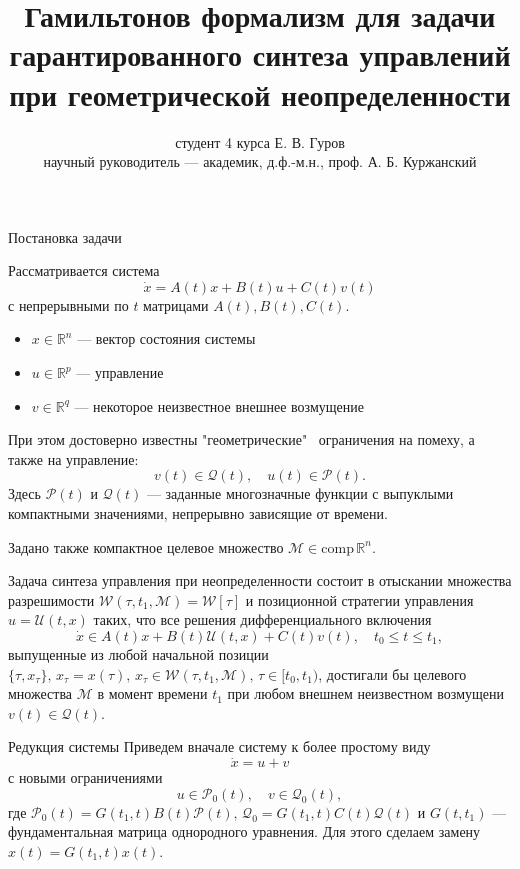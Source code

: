 \documentclass{beamer}
\title[ВКР]
{Гамильтонов формализм для задачи гарантированного синтеза управлений при геометрической неопределенности}
\author[Е. В. Гуров]
{студент 4 курса Е. В. Гуров \\
научный руководитель --- академик, д.ф.-м.н., проф. А. Б. Куржанский}
\institute[СА]
{ Кафедра системного анализа \\
факультета ВМК МГУ имени М.В. Ломоносова}
\date[2 июня 2022 г.]
\begin{document}
\frame{\titlepage}

\begin{frame}{Постановка задачи}

Рассматривается система
\begin{equation*}
    \dot{x} = A(t)x + B(t)u + C(t)v(t)
\end{equation*}
с непрерывными по \( t \) матрицами \( A(t), B(t), C(t) \).
\begin{itemize}
    \item \( x \in \mathbb{R}^n \) --- вектор состояния системы
    \item \( u \in \mathbb{R}^p \) --- управление
    \item \( v \in \mathbb{R}^q \) --- некоторое неизвестное внешнее возмущение
\end{itemize}
При этом достоверно известны "геометрические" \ ограничения на помеху, а также на управление:
\begin{equation*}
    v(t) \in \mathcal{Q}(t), \quad u(t) \in \mathcal{P}(t).
\end{equation*}
 Здесь \( \mathcal{P}(t) \) и \( \mathcal{Q}(t) \) --- заданные многозначные
 функции с выпуклыми компактными значениями, непрерывно зависящие от времени.
 
 Задано также компактное целевое множество \( \mathcal{M} \in \text{comp} \, \mathbb{R}^n \).

\end{frame}

\begin{frame}

Задача синтеза управления при неопределенности состоит в отыскании множества разрешимости \( \mathcal{W}(\tau, t_1, \mathcal{M}) = \mathcal{W}[\tau] \) и позиционной стратегии управления \( u = \mathcal{U}(t,x) \) таких, что все решения дифференциального включения
 \begin{equation*}\label{dif_inclusion}
    \dot{x} \in A(t)x + B(t)\mathcal{U}(t,x) + C(t)v(t), \quad t_0 \le t \le t_1, 
\end{equation*}
выпущенные из любой начальной позиции \( \{\tau, x_{\tau}\}, \, x_{\tau} = x(\tau), \, x_{\tau} \in \mathcal{W}(\tau, t_1, \mathcal{M}), \, \tau \in [t_0, t_1) \), достигали бы целевого множества \( \mathcal{M} \) в момент времени \( t_1 \) при любом внешнем неизвестном возмущени \( v(t) \in \mathcal{Q}(t) \). 

\end{frame}

\begin{frame}{Редукция системы}
Приведем вначале систему к более простому виду
\begin{equation*}
    \dot{x} = u + v
\end{equation*}
с новыми ограничениями
\begin{equation*}
    u \in \mathcal{P}_0(t), \quad v \in \mathcal{Q}_0(t),
\end{equation*}
где \( \mathcal{P}_0(t) = G(t_1, t) B(t) \mathcal{P}(t), \, \mathcal{Q}_0 = G(t_1,t)C(t)\mathcal{Q}(t) \) и \( G(t,t_1) \) --- фундаментальная матрица однородного уравнения. Для этого сделаем замену \( x(t) = G(t_1, t)x(t) \).
\end{frame}
\end{document}
